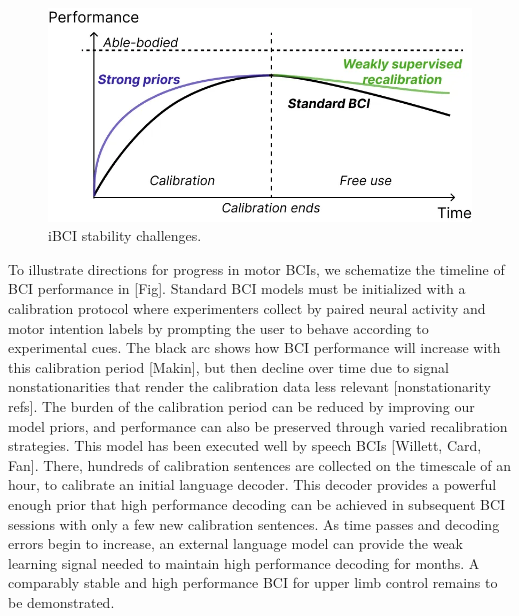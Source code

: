 \documentclass[12pt,oneside]{report}
\begin{document}
\begin{figure}[h]
  \centering
  \includegraphics[width=0.9\linewidth]{ch1_ibci_stability.png}
  \caption{iBCI stability challenges.}
  \label{fig:ibci_stability}
\end{figure}
To illustrate directions for progress in motor BCIs, we schematize the timeline of BCI performance in [Fig]. Standard BCI models must be initialized with a calibration protocol where experimenters collect by paired neural activity and motor intention labels by prompting the user to behave according to experimental cues. The black arc shows how BCI performance will increase with this calibration period [Makin], but then decline over time due to signal nonstationarities that render the calibration data less relevant [nonstationarity refs]. The burden of the calibration period can be reduced by improving our model priors, and performance can also be preserved through varied recalibration strategies. This model has been executed well by speech BCIs [Willett, Card, Fan]. There, hundreds of calibration sentences are collected on the timescale of an hour, to calibrate an initial language decoder. This decoder provides a powerful enough prior that high performance decoding can be achieved in subsequent BCI sessions with only a few new calibration sentences. As time passes and decoding errors begin to increase, an external language model can provide the weak learning signal needed to maintain high performance decoding for months. A comparably stable and high performance BCI for upper limb control remains to be demonstrated.
\end{document}
